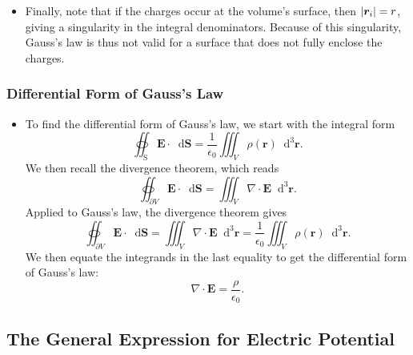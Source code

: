 \documentclass[11pt, a4paper]{article}
\newcommand{\diff}{\mathop{}\!\mathrm{d}} %
\newcommand{\dr}{\diff^{3} \r}  %
\renewcommand{\vec}[1]{\bm{#1}} %
\renewcommand{\r}{\vec{r}}
\newcommand{\E}{\vec{E}} %
\newcommand{\ee}{\epsilon_{0}}  %
\renewcommand{\div}{\nabla \cdot}
\begin{document}
\begin{itemize}
	\item Finally, note that if the charges occur at the volume's surface, then $ \abs{\r_{i}} = r $, giving a singularity in the integral denominators. Because of this singularity, Gauss's law is thus not valid for a surface that does not fully enclose the charges.
\end{itemize}

\subsubsection{Differential Form of Gauss's Law}
\begin{itemize}
	\item To find the differential form of Gauss's law, we start with the integral form
	\begin{equation*}
		\oiint_{\text{S}} \E \cdot \diff \vec{S} = \frac{1}{\ee}\iiint_{V}\rho(\r) \dr.
	\end{equation*}
	We then recall the divergence theorem, which reads
	\begin{equation*}
		\oiint_{\partial V} \E \cdot \diff \vec{S} = \iiint_{V}\div \E \dr.
	\end{equation*}
	Applied to Gauss's law, the divergence theorem gives
	\begin{equation*}
		\oiint_{\partial V} \E \cdot \diff \vec{S} = \iiint_{V}\div \E \dr = \frac{1}{\ee} \iiint_{V} \rho(\r) \dr.
	\end{equation*}
	We then equate the integrands in the last equality to get the differential form of Gauss's law:
	\begin{equation*}
		\div \E = \frac{\rho}{\ee}.
	\end{equation*}
\end{itemize}

\subsection{The General Expression for Electric Potential}
\end{document}
